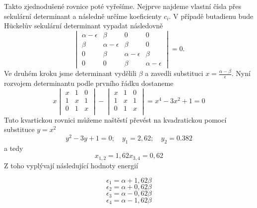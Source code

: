 Takto zjednodušené rovnice poté vyřešíme. Nejprve najdeme vlastní čísla přes sekulární determinant a následně určíme koeficienty $c_i$. V případě butadienu bude H\"{u}ckelův sekulární determinant vypadat následovně
\begin{equation}
\begin{vmatrix}
\alpha-\epsilon & \beta & 0 & 0  \\
\beta &\alpha-\epsilon & \beta & 0  \\
0 &\beta &\alpha-\epsilon & \beta  \\
0 & 0 & \beta &\alpha-\epsilon  
\end{vmatrix}
= 0.
\end{equation}
Ve druhém kroku jsme determinant vydělili $\beta$ a zavedli substituci $x=\frac{\alpha-\beta}{\epsilon}$.
Nyní rozvojem determinantu podle prvního řádku dostaneme
\begin{equation}
x
\begin{vmatrix}
x & 1 & 0 \\
1 & x & 1 \\
0 & 1 & x \\
\end{vmatrix}
-
\begin{vmatrix}
x & 1 & 0 \\
1 & x & 1 \\
0 & 1 & x \\
\end{vmatrix}
=x^4-3x^2+1=0 \nonumber
\end{equation}
Tuto kvartickou rovnici můžeme naštěstí převést na kvadratickou pomocí substituce $y=x^2$
\begin{equation}
y^2-3y+1=0;\quad y_1=2,62;\quad y_2=0.382 \nonumber
\end{equation}
a tedy
\begin{equation}
x_{1,2}=1,62 \nonumber
x_{3,4}=0,62 \nonumber
\end{equation}
Z toho vyplývají následující hodnoty energií

$$ \epsilon_1 = \alpha+1,62\beta $$
$$ \epsilon_2 = \alpha+0,62\beta $$
$$ \epsilon_3 = \alpha-0,62\beta $$
$$ \epsilon_4 = \alpha-1,62\beta $$

